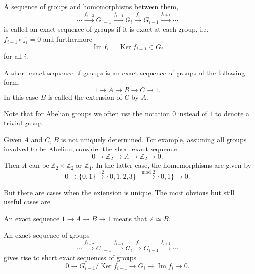 \documentclass[12pt]{article}
\numberwithin{equation}{section}
\def\bZ{\mathbb{Z}}
\def\Ker{\mathop{\mathrm{Ker}}}
\def\Im{\mathop{\mathrm{Im}}}
\begin{document}
\begin{definition}
  A sequence of groups and homomorphisms between them, \begin{equation}
  \cdots 
  \stackrel{f_{i-2}}{\longrightarrow} G_{i-1} 
  \stackrel{f_{i-1}}{\longrightarrow} G_{i}
  \stackrel{f_{i}}{\longrightarrow} G_{i+1}
  \stackrel{f_{i+1}}{\longrightarrow} \cdots
  \end{equation}
is called an exact sequence of groups if it is exact at each group, i.e.~
$f_{i-1}\circ f_i=0$ and furthermore 
\begin{equation}
 \Im f_{i}  = \Ker f_{i+1} \subset G_i \label{eq:exactness}
\end{equation}
for all $i$.
\end{definition}

\begin{definition}
  A short exact sequence of groups is an exact sequence of groups of the following form: \begin{equation}
  1 \to A \to B \to C \to 1.
  \end{equation}
  In this case $B$ is called the extension of $C$ by $A$.
\end{definition}
Note that for Abelian groups we often use the notation $0$ instead of $1$
to denote a trivial group.

Given $A$ and $C$, $B$ is not uniquely determined.
For example, assuming all groups involved to be Abelian,
consider the short exact sequence \begin{equation}
  0 \to \bZ_2 \to A \to \bZ_2 \to 0.
\end{equation}  
Then $A$ can be $\bZ_2\times \bZ_2$ or $\bZ_4$.
In the latter case, the homomorphisms are given by \begin{equation}
0 \to \{0,1\} \xrightarrow{\times 2} \{0,1,2,3\} \xrightarrow{\mod 2} \{0,1\} \to 0.
\end{equation}

But there are cases when the extension is unique. 
The most obvious but still useful cases are:
\begin{example}
An exact sequence $1\to A\to B\to 1$ means that $A\simeq B$.
\end{example}

\begin{proposition}
  An exact sequence of groups\begin{equation}
    \cdots 
    \stackrel{f_{i-2}}{\longrightarrow} G_{i-1} 
    \stackrel{f_{i-1}}{\longrightarrow} G_{i}
    \stackrel{f_{i}}{\longrightarrow} G_{i+1}
    \stackrel{f_{i+1}}{\longrightarrow} \cdots
  \end{equation}
  gives rise to short exact sequences of groups \begin{equation}
    0 \to G_{i-1}/\Ker f_{i-1} \to G_i \to \Im f_{i} \to 0.
  \end{equation}
\end{proposition}
\end{document}
